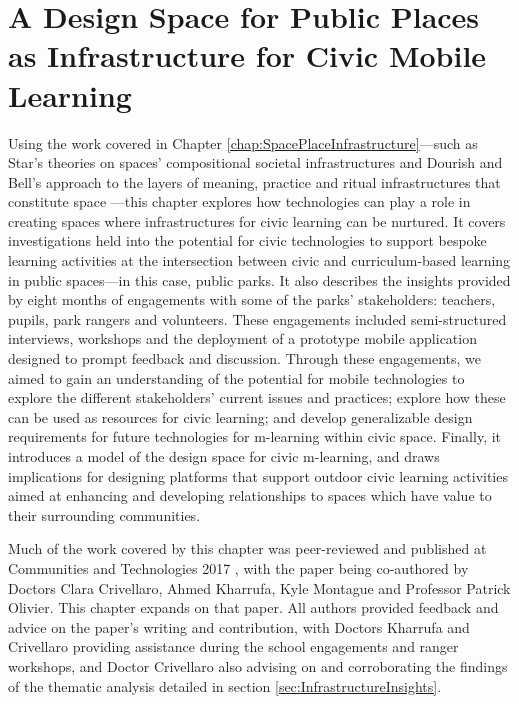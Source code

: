 \chapter{A Design Space for Public Places as Infrastructure for Civic Mobile Learning}
\label{chap:DesignSpace}

Using the work covered in Chapter \ref{chap:SpacePlaceInfrastructure}---such as Star’s theories on spaces’ compositional societal infrastructures \citep{Star1999} and Dourish and Bell’s approach to the layers of meaning, practice and ritual infrastructures that constitute space \citep{Dourish2006}---this chapter explores how technologies can play a role in creating spaces where infrastructures for civic learning can be nurtured. It covers investigations held into the potential for civic technologies to support bespoke learning activities at the intersection between civic and curriculum-based learning in public spaces---in this case, public parks. It also describes the insights provided by eight months of engagements with some of the parks' stakeholders: teachers, pupils, park rangers and volunteers. These engagements included semi-structured interviews, workshops and the deployment of a prototype mobile application designed to prompt feedback and discussion. Through these engagements, we aimed to gain an understanding of the potential for mobile technologies to explore the different stakeholders' current issues and practices; explore how these can be used as resources for civic learning; and develop generalizable design requirements for future technologies for m-learning within civic space. Finally, it introduces a model of the design space for civic m-learning, and draws implications for designing platforms that support outdoor civic learning activities aimed at enhancing and developing relationships to spaces which have value to their surrounding communities. 

Much of the work covered by this chapter was peer-reviewed and published at Communities and Technologies 2017 \citep{Richardson2017}, with the paper being co-authored by Doctors Clara Crivellaro, Ahmed Kharrufa, Kyle Montague and Professor Patrick Olivier. This chapter expands on that paper. All authors provided feedback and advice on the paper's writing and contribution, with Doctors Kharrufa and Crivellaro providing assistance during the school engagements and ranger workshops, and Doctor Crivellaro also advising on and corroborating the findings of the thematic analysis detailed in section \ref{sec:InfrastructureInsights}.

